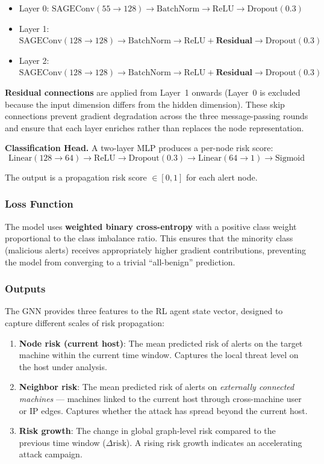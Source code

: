 \begin{itemize}
    \item Layer 0: $\text{SAGEConv}(55 \to 128) \to \text{BatchNorm} \to \text{ReLU} \to \text{Dropout}(0.3)$
    \item Layer 1: $\text{SAGEConv}(128 \to 128) \to \text{BatchNorm} \to \text{ReLU} + \textbf{Residual} \to \text{Dropout}(0.3)$
    \item Layer 2: $\text{SAGEConv}(128 \to 128) \to \text{BatchNorm} \to \text{ReLU} + \textbf{Residual} \to \text{Dropout}(0.3)$
\end{itemize}

\textbf{Residual connections} are applied from Layer~1 onwards (Layer~0 is excluded because the input dimension differs from the hidden dimension). These skip connections prevent gradient degradation across the three message-passing rounds and ensure that each layer enriches rather than replaces the node representation.

\textbf{Classification Head.} A two-layer MLP produces a per-node risk score:
$$\text{Linear}(128 \to 64) \to \text{ReLU} \to \text{Dropout}(0.3) \to \text{Linear}(64 \to 1) \to \text{Sigmoid}$$

The output is a propagation risk score $\in [0, 1]$ for each alert node.

\subsubsection{Loss Function}

The model uses \textbf{weighted binary cross-entropy} with a positive class weight proportional to the class imbalance ratio. This ensures that the minority class (malicious alerts) receives appropriately higher gradient contributions, preventing the model from converging to a trivial ``all-benign'' prediction.

\subsubsection{Outputs}

The GNN provides three features to the RL agent state vector, designed to capture different scales of risk propagation:

\begin{enumerate}
    \item \textbf{Node risk (current host)}: The mean predicted risk of alerts on the target machine within the current time window. Captures the local threat level on the host under analysis.
    \item \textbf{Neighbor risk}: The mean predicted risk of alerts on \textit{externally connected machines} --- machines linked to the current host through cross-machine user or IP edges. Captures whether the attack has spread beyond the current host.
    \item \textbf{Risk growth}: The change in global graph-level risk compared to the previous time window ($\Delta \text{risk}$). A rising risk growth indicates an accelerating attack campaign.
\end{enumerate}

